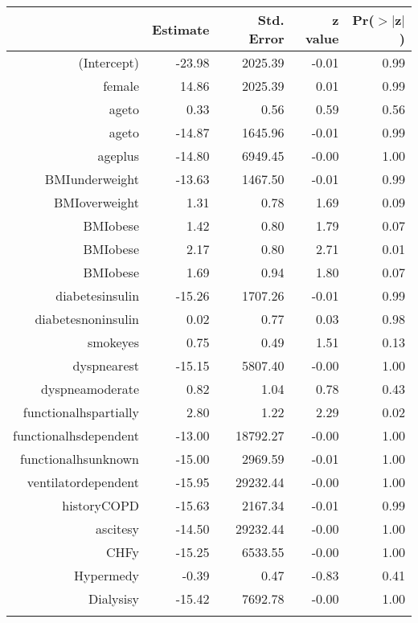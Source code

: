 
\bigskip\bigskip
\centering
\begin{tabular}{rrrrr}
  \hline
 & Estimate & Std. Error & z value & Pr($>$$|$z$|$) \\ 
  \hline
(Intercept) & -23.98 & 2025.39 & -0.01 & 0.99 \\ 
  female & 14.86 & 2025.39 & 0.01 & 0.99 \\ 
  age\-65\-to\-74 & 0.33 & 0.56 & 0.59 & 0.56 \\ 
  age\-75\-to\-84 & -14.87 & 1645.96 & -0.01 & 0.99 \\ 
  age\-85\-plus & -14.80 & 6949.45 & -0.00 & 1.00 \\ 
  BMI\-underweight & -13.63 & 1467.50 & -0.01 & 0.99 \\ 
  BMI\-overweight & 1.31 & 0.78 & 1.69 & 0.09 \\ 
  BMI\-obese\-1 & 1.42 & 0.80 & 1.79 & 0.07 \\ 
  BMI\-obese\-2 & 2.17 & 0.80 & 2.71 & 0.01 \\ 
  BMI\-obese\-3 & 1.69 & 0.94 & 1.80 & 0.07 \\ 
  diabetes\-insulin & -15.26 & 1707.26 & -0.01 & 0.99 \\ 
  diabetes\-noninsulin & 0.02 & 0.77 & 0.03 & 0.98 \\ 
  smoke\-yes & 0.75 & 0.49 & 1.51 & 0.13 \\ 
  dyspnea\-rest & -15.15 & 5807.40 & -0.00 & 1.00 \\ 
  dyspnea\-moderate & 0.82 & 1.04 & 0.78 & 0.43 \\ 
  functional\-hs\-partially & 2.80 & 1.22 & 2.29 & 0.02 \\ 
  functional\-hs\-dependent & -13.00 & 18792.27 & -0.00 & 1.00 \\ 
  functional\-hs\-unknown & -15.00 & 2969.59 & -0.01 & 1.00 \\ 
  ventilator\-dependent & -15.95 & 29232.44 & -0.00 & 1.00 \\ 
  history\-COPD & -15.63 & 2167.34 & -0.01 & 0.99 \\ 
  ascites\-y & -14.50 & 29232.44 & -0.00 & 1.00 \\ 
  CHF\-y & -15.25 & 6533.55 & -0.00 & 1.00 \\ 
  Hyper\-med\-y & -0.39 & 0.47 & -0.83 & 0.41 \\ 
  Dialysis\-y & -15.42 & 7692.78 & -0.00 & 1.00 \\ 
$$
\end{tabular}
